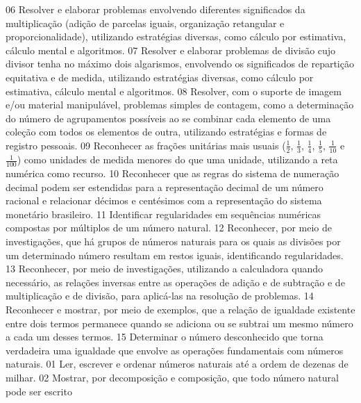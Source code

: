 {{{{{						}
						{06}{%
							Resolver e elaborar problemas envolvendo diferentes significados da multiplicação
							(adição de parcelas iguais, organização retangular e proporcionalidade), utilizando estratégias
							diversas, como cálculo por estimativa, cálculo mental e algoritmos.
						}
						{07}{%
							Resolver e elaborar problemas de divisão cujo divisor tenha no máximo dois algarismos,
							envolvendo os significados de repartição equitativa e de medida, utilizando estratégias diversas,
							como cálculo por estimativa, cálculo mental e algoritmos.
						}
						{08}{%
							Resolver, com o suporte de imagem e/ou material manipulável, problemas simples
							de contagem, como a determinação do número de agrupamentos possíveis ao se combinar cada
							elemento de uma coleção com todos os elementos de outra, utilizando estratégias e formas de
							registro pessoais.
						}
						{09}{%
							Reconhecer as frações unitárias mais usuais (\(\frac{1}{2}\), \(\frac{1}{3}\), \(\frac{1}{4}\), \(\frac{1}{5}\), \(\frac{1}{10}\) e \(\frac{1}{100}\)) como
							unidades de medida menores do que uma unidade, utilizando a reta numérica como recurso.
						}
						{10}{%
							Reconhecer que as regras do sistema de numeração decimal podem ser estendidas
							para a representação decimal de um número racional e relacionar décimos e centésimos com a
							representação do sistema monetário brasileiro.
						}
						{11}{%
							Identificar regularidades em sequências numéricas compostas por múltiplos de um
							número natural.
						}
						{12}{%
							Reconhecer, por meio de investigações, que há grupos de números naturais para os
							quais as divisões por um determinado número resultam em restos iguais, identificando regularidades.
						}
						{13}{%
							Reconhecer, por meio de investigações, utilizando a calculadora quando necessário, as
							relações inversas entre as operações de adição e de subtração e de multiplicação e de divisão, para
							aplicá-las na resolução de problemas.
						}
						{14}{%
							Reconhecer e mostrar, por meio de exemplos, que a relação de igualdade existente
							entre dois termos permanece quando se adiciona ou se subtrai um mesmo número a cada um desses
							termos.
						}
						{15}{%
							Determinar o número desconhecido que torna verdadeira uma igualdade que envolve as
							operações fundamentais com números naturais.
						}
						{01}{%
							Ler, escrever e ordenar números naturais até a ordem de dezenas de milhar.
						}
						{02}{%
							Mostrar, por decomposição e composição, que todo número natural pode ser escrito
}}}}}
